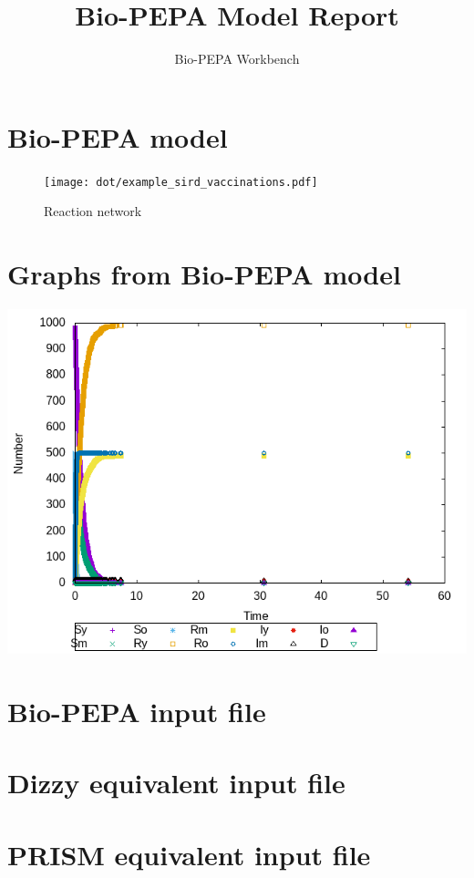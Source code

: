 \documentclass{llncs}
\title{Bio-PEPA Model Report}
\author{Bio-PEPA Workbench}
\institute{\today}
\begin{document}
\maketitle
\section{Bio-PEPA model}

\begin{figure}[htbp]
\begin{center}
\texttt{[image: dot/example\_sird\_vaccinations.pdf]}
\caption{Reaction network}
\end{center}
\end{figure}
\newpage
\section{Graphs from Bio-PEPA model}
\includegraphics[scale=0.5]{png/example_sird_vaccinations001_stochkit_results_0}
\appendix
\newpage
\section{Bio-PEPA input file}

\newpage
\section{Dizzy equivalent input file}

\newpage
\section{PRISM equivalent input file}

\end{document}
